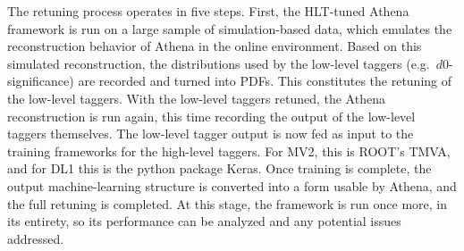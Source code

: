         The retuning process operates in five steps.
        First, the HLT-tuned Athena framework is run on a large sample of simulation-based data,
            which emulates the reconstruction behavior of Athena in the online environment.
        Based on this simulated reconstruction, the distributions used by the low-level taggers
            (e.g.\ $d0$-significance) are recorded and turned into PDFs.
        This constitutes the retuning of the low-level taggers.
        With the low-level taggers retuned, the Athena reconstruction is run again,
            this time recording the output of the low-level taggers themselves.
        The low-level tagger output is now fed as input to the training frameworks for the high-level taggers.
        For MV2, this is ROOT's TMVA, and for DL1 this is the python package Keras.
        Once training is complete, the output machine-learning structure is converted into a form usable by Athena,
            and the full retuning is completed.
        At this stage, the framework is run once more, in its entirety,
            so its performance can be analyzed and any potential issues addressed.



